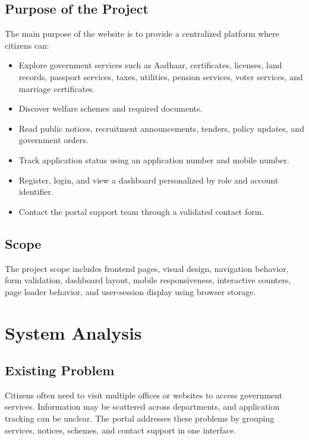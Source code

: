 \documentclass[12pt,a4paper]{report}
\begin{document}
\section{Purpose of the Project}
The main purpose of the website is to provide a centralized platform where citizens can:
\begin{itemize}[leftmargin=0.4in]
    \item Explore government services such as Aadhaar, certificates, licenses, land records, passport services, taxes, utilities, pension services, voter services, and marriage certificates.
    \item Discover welfare schemes and required documents.
    \item Read public notices, recruitment announcements, tenders, policy updates, and government orders.
    \item Track application status using an application number and mobile number.
    \item Register, login, and view a dashboard personalized by role and account identifier.
    \item Contact the portal support team through a validated contact form.
\end{itemize}

\section{Scope}
The project scope includes frontend pages, visual design, navigation behavior, form validation, dashboard layout, mobile responsiveness, interactive counters, page loader behavior, and user-session display using browser storage.

\chapter{System Analysis}
\section{Existing Problem}
Citizens often need to visit multiple offices or websites to access government services. Information may be scattered across departments, and application tracking can be unclear. The portal addresses these problems by grouping services, notices, schemes, and contact support in one interface.
\end{document}
